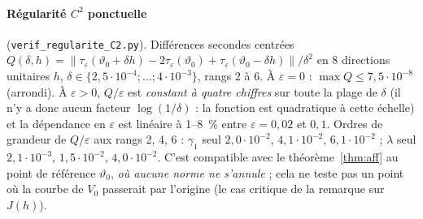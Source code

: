 \documentclass[11pt,a4paper]{article}
\theoremstyle{remark}
\theoremstyle{definition}
\newcommand{\norm}[1]{\lVert #1\rVert}
\newcommand{\eps}{\varepsilon}
\newcommand{\vth}{\vartheta}
\begin{document}
\paragraph{Régularité $C^2$ ponctuelle} (\texttt{verif\_regularite\_C2.py}). Différences secondes centrées $Q(\delta,h)=\norm{\tau_\eps(\vth_0+\delta h)-2\tau_\eps(\vth_0)+\tau_\eps(\vth_0-\delta h)}/\delta^2$ en 8 directions unitaires $h$, $\delta\in\{2{,}5\cdot10^{-4};\ldots;4\cdot10^{-3}\}$, rangs 2 à 6. À $\eps=0$ : $\max Q\le7{,}5\cdot10^{-8}$ (arrondi). À $\eps>0$, $Q/\eps$ est \emph{constant à quatre chiffres} sur toute la plage de $\delta$ (il n'y a donc aucun facteur $\log(1/\delta)$ : la fonction est quadratique à cette échelle) et la dépendance en $\eps$ est linéaire à 1--8~\% entre $\eps=0{,}02$ et $0{,}1$. Ordres de grandeur de $Q/\eps$ aux rangs 2, 4, 6 : $\gamma_1$ seul $2{,}0\cdot10^{-2}$, $4{,}1\cdot10^{-2}$, $6{,}1\cdot10^{-2}$ ; $\lambda$ seul $2{,}1\cdot10^{-3}$, $1{,}5\cdot10^{-2}$, $4{,}0\cdot10^{-2}$. C'est compatible avec le théorème~\ref{thm:aff} au point de référence $\vth_0$, \emph{où aucune norme ne s'annule} ; cela ne teste pas un point où la courbe de $V_0$ passerait par l'origine (le cas critique de la remarque sur $J(h)$).
\end{document}
